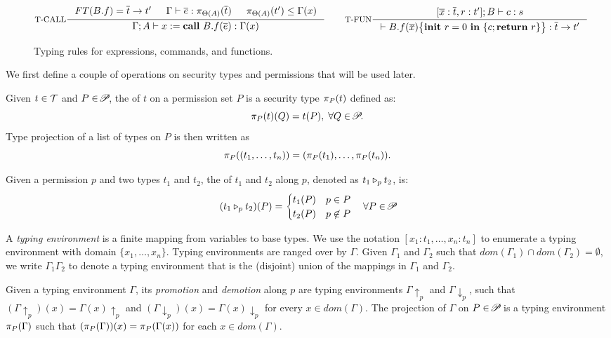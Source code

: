 {{{\begin{figure*}
\[
\inference[T-CALL]
{\FT(B.f) = \overline{t} \rightarrow t' &
\Gamma \vdash \overline{e} : \app{\overline{t}}{\Theta(A)} &
\app{t'}{\Theta(A)} \leq \Gamma(x)}
{\Gamma; A \vdash \lcCALL{x}{B.f}{\overline{e}} :
 \Gamma(x)  }
\qquad
\inference[T-FUN]
{[\overline{x}:\overline{t}, r : t'] ; B\vdash c : s}
{ \vdash \lpFUN{B.f}{\overline{x}}{c} :
  \overline{t} \rightarrow t'}
\]
\caption{Typing rules for expressions, commands, and functions.}
\label{fig:typing-rules}
\end{figure*}


 
We first define a couple of operations on security types and permissions that will
be used later.

\begin{definition}\label{def:projection}
Given $t\in\Tcal$ and $P\in\PPS$, the  of $t$ on a permission set $P$ is a security type  $\app{t}{P}$ defined as: \begin{equation*}
\app{t}{P}(Q) = t(P),\; \forall Q\in \PPS.
\end{equation*}
Type projection of a list of types
on $P$ is then written as
\[
\app{(t_1,\dots,t_n)}{P} = (\app{t_1}{P}, \dots, \app{t_n}{P}).
\]
\end{definition}

\begin{definition}\label{def:merge}
Given a permission $p$ and two types $t_1$ and $t_2$, the {} of
$t_1$ and $t_2$ along $p$, denoted as $\omerge {p} {t_1} {t_2}$, is:
\begin{equation*}
(\omerge p {t_1} {t_2}) (P) =
\begin{cases}
t_1(P) & p\in P \\
t_2(P) & p\not\in P\\
\end{cases}
\quad\forall P\in{\PPS}
\end{equation*}
\end{definition}

A {\em typing environment} is a finite mapping from variables to base types.
We use the notation  $[x_1 : t_1, \dots, x_n : t_n]$
to enumerate a typing environment with domain $\{x_1,\dots,x_n\}.$
Typing environments are ranged over by $\Gamma.$
Given $\Gamma_1$ and $\Gamma_2$ such that $dom(\Gamma_1) \cap dom(\Gamma_2) = \emptyset$,
we write $\Gamma_1\Gamma_2$ to denote a typing environment that is the (disjoint) union of the mappings
in $\Gamma_1$ and $\Gamma_2$.

\begin{definition}\label{def:tenv-pd}
  Given a typing environment $\Gamma$, its {\em promotion} and {\em demotion} along $p$
  are typing environments $\Gamma\!\uparrow_p$ and $\Gamma\!\downarrow_p$, such that
$(\Gamma\!\uparrow_{p})(x) = \Gamma(x)\!\uparrow_{p}$ and
$(\Gamma\!\downarrow_{p})(x) = \Gamma(x)\!\downarrow_{p}$ for every $x \in dom(\Gamma).$
  The projection of $\Gamma$ on $P \in \PPS$ is a typing environment $\app{\Gamma}{P}$ such that
$(\app{\Gamma}{P})(x) = \app{\Gamma(x)}{P}$ for each $x \in dom(\Gamma).$
\end{definition}

}}}
